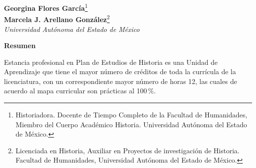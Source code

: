 %
\thispagestyle{empty}	
{}
{}
\setcounter{footnote}{0}

\renewcommand*{\thefootnote}{\fnsymbol{footnote}}

\bigskip
\begin{center}
{\bfseries Georgina Flores García}\footnote{Historiadora. Docente de Tiempo
Completo de la Facultad de Humanidades, Miembro del Cuerpo Académico
Historia. Universidad Autónoma del Estado de México.}\\
{\bfseries Marcela J. Arellano González}\footnote{Licenciada en Historia,
Auxiliar en Proyectos de investigación de Historia. Facultad de
Humanidades, Universidad Autónoma del Estado de México.}\\
{\itshape Universidad Autónoma del Estado de México}
\end{center}

\bigskip
\textbf{Resumen}
\renewcommand*{\thefootnote}{\arabic{footnote}}
\setcounter{footnote}{0}
\enlargethispage{1\baselineskip}

Estancia profesional en Plan de Estudios de Historia es una Unidad de
Aprendizaje que tiene el mayor número de créditos de toda la currícula de
la licenciatura, con un correspondiente mayor número de horas 12, las
cuales de acuerdo al mapa curricular son prácticas al 100\,\%.


